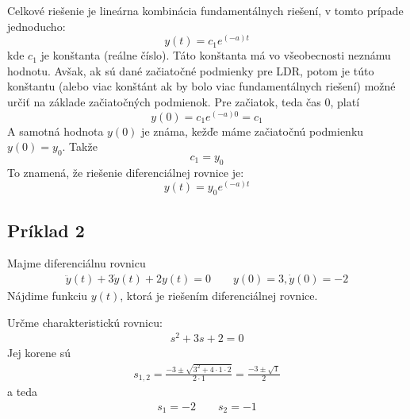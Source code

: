 \documentclass[a4paper, 10pt, ]{article}
\begin{document}
Celkové riešenie je lineárna kombinácia fundamentálnych riešení, v tomto prípade jednoducho:
\begin{equation}
     y(t)  = c_1 e^{(-a) t}
\end{equation}
kde $c_1$ je konštanta (reálne číslo). Táto konštanta má vo všeobecnosti neznámu hodnotu. Avšak, ak sú dané začiatočné podmienky pre LDR, potom je túto konštantu (alebo viac konštánt ak by bolo viac fundamentálnych riešení) možné určiť na základe začiatočných podmienok. Pre začiatok, teda čas 0, platí
\begin{equation}
     y(0)  = c_1 e^{(-a) 0} = c_1
\end{equation}
A samotná hodnota $y(0)$ je známa, kežďe máme začiatočnú podmienku $y(0) = y_0$. Takže
\begin{equation}
     c_1 = y_0
\end{equation}
To znamená, že riešenie diferenciálnej rovnice je:
\begin{equation}
     y(t)  = y_0 e^{(-a) t}
\end{equation}











\subsection{Príklad 2}


Majme diferenciálnu rovnicu
\begin{align}
    \ddot y(t) + 3\dot y(t) + 2 y(t) = 0 \qquad y(0)=3, \dot y(0) = -2
\end{align}
Nájdime funkciu $y(t)$, ktorá je riešením diferenciálnej rovnice.

Určme charakteristickú rovnicu:
\begin{align}
    s^2 +3s + 2 = 0
\end{align}
Jej korene sú
\begin{align}
    s_{1, 2} = \frac{-3 \pm \sqrt{3^2 + 4\cdot1\cdot2}}{2\cdot1} = \frac{-3 \pm \sqrt{1}}{2}
\end{align}
a teda
\begin{align}
    s_1 = -2 \qquad s_2 = -1
\end{align}
\end{document}
